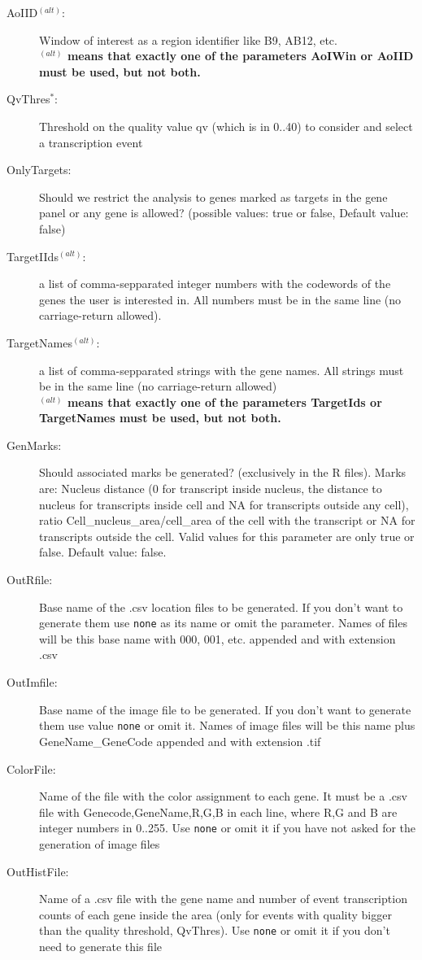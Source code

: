 \documentclass[11pt]{report}
\begin{document}
\begin{description}
\item[AoIID$^{(alt)}$:] Window of interest as a region identifier like B9, AB12, etc.\\
{\bf $^{(alt)}$ means that exactly one of the parameters AoIWin or AoIID must be used, but not both.}
\item[QvThres$^*$:] Threshold on the quality value qv (which is in 0..40) to consider and select a transcription event
\item[OnlyTargets:] Should we restrict the analysis to genes marked as targets in the gene panel or any gene is allowed? (possible values:
true or false, Default value: false)
\item[TargetIIds$^{(alt)}$:] a list of comma-sepparated integer numbers with the codewords of the genes the user is interested in. All numbers must be in the same line (no carriage-return allowed).
\item[TargetNames$^{(alt)}$:] a list of comma-sepparated strings with the gene names. All strings must be in the same line (no carriage-return allowed)\\
{\bf $^{(alt)}$ means that exactly one of the parameters TargetIds or TargetNames must be used, but not both.}
\item[GenMarks:] Should associated marks be generated? (exclusively in the R files). Marks are: Nucleus distance (0 for transcript inside nucleus,
the distance to nucleus for transcripts inside cell and NA for transcripts outside any cell), ratio Cell\_nucleus\_area/cell\_area of the cell with the transcript or NA for transcripts outside the cell. Valid values for this parameter are only true or false. Default value: false.
\item[OutRfile:] Base name of the .csv location files to be generated. If you don't want to generate them use {\tt none} as its name or omit the parameter.
Names of files will be this base name with 000, 001, etc. appended and with extension .csv
\item[OutImfile:] Base name of the image file to be generated. If you don't want to generate them use value {\tt none} or omit it. Names of image files will be 
this name plus GeneName\_GeneCode appended and with extension .tif
\item[ColorFile:] Name of the file with the color assignment to each gene. It must be a .csv file with Genecode,GeneName,R,G,B in each line, where R,G and B 
are integer numbers in 0..255. Use {\tt none} or omit it if you have not asked for  the generation of image files
\item[OutHistFile:] Name of a .csv file with the gene name and number of event transcription counts of each gene inside the area (only for events with 
quality  bigger than the quality threshold, QvThres). Use {\tt none} or omit it if you don't need to generate this file
\end{description}
\end{document}
